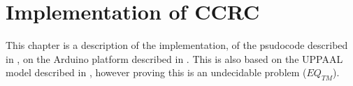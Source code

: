 \chapter{Implementation of CCRC}
This chapter is a description of the implementation, of the psudocode described in , on the Arduino platform described in . 
This is also based on the UPPAAL model described in , however proving this is an undecidable problem ($EQ_{TM}$).
